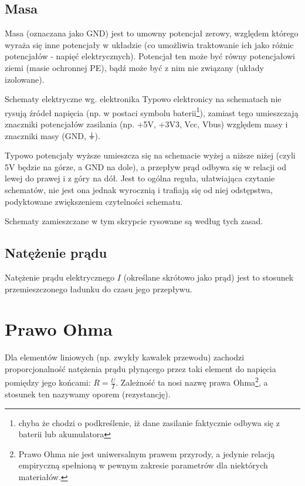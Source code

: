\subsection{Masa}
   Masa (oznaczana jako GND) jest to
   umowny potencjał zerowy, względem którego wyraża się inne potencjały w układzie (co umożliwia traktowanie ich jako różnic potencjałów - napięć elektrycznych). Potencjał ten może być równy potencjałowi ziemi (masie ochronnej PE), bądź może być z nim nie związany (układy izolowane).

\begin{ProTip}{Schematy elektryczne wg. elektronika}
Typowo elektronicy na schematach nie rysują źródeł napięcia (np. w postaci symbolu baterii\footnote{chyba że chodzi o podkreślenie, iż dane zasilanie faktycznie odbywa się z baterii lub akumulatora}),
zamiast tego umieszczają znaczniki potencjałów zasilania (np. +5V, +3V3, Vcc, Vbus) względem masy i znaczniki masy (GND, {\Symbola ⏚}).

\vspace{3pt}Typowo potencjały wyższe umieszcza się na schemacie wyżej a niższe niżej (czyli 5V będzie na górze, a GND na dole), a przepływ prąd odbywa się w relacji od lewej do prawej i z góry na dół.
Jest to ogólna reguła, ułatwiająca czytanie schematów, nie jest ona jednak wyrocznią i trafiają się od niej odstępstwa, podyktowane zwiększeniem czytelności schematu.

\vspace{3pt}Schematy zamieszczane w tym skrypcie rysowane są według tych zasad.
\end{ProTip}

\subsection{Natężenie prądu}
    Natężenie prądu elektrycznego $I$ (określane skrótowo jako prąd)
    jest to stosunek przemieszczonego ładunku do czasu jego przepływu.

\section{Prawo Ohma}
Dla elementów liniowych (np. zwykły kawałek przewodu) zachodzi proporcjonalność natężenia prądu płynącego przez taki element do napięcia pomiędzy jego końcami: $R=\frac{U}{I}$.
Zależność ta nosi nazwę prawa Ohma\footnote{Prawo Ohma nie jest uniwersalnym prawem przyrody, a jedynie relacją empiryczną spełnioną w pewnym zakresie parametrów dla niektórych materiałów.}, a stosunek ten nazywamy oporem (rezystancję).

